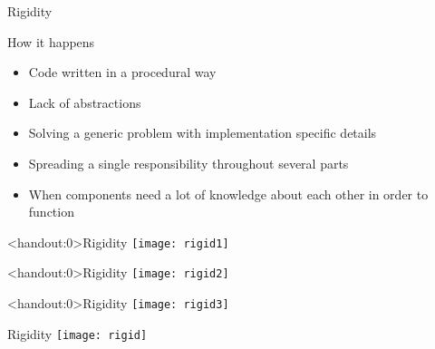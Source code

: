 \documentclass[xcolor=svgnames]{beamer}
\begin{document}
{%
%
\begin{frame}{Rigidity}

    How it happens
    \begin{itemize}
        \item<1-> Code written in a procedural way
        \item<2-> Lack of abstractions
        \item<3-> Solving a generic problem with implementation specific details
        \item<4-> Spreading a single responsibility throughout several parts
        \item<5-> When components need a lot of knowledge about each other in
            order to function
    \end{itemize}
\end{frame}
}


{%
%
\begin{frame}<handout:0>{Rigidity}
    \centering
    \texttt{[image: rigid1]}
\end{frame}
}

{%
%
\begin{frame}<handout:0>{Rigidity}
    \centering
    \texttt{[image: rigid2]}
\end{frame}
}

{%
%
\begin{frame}<handout:0>{Rigidity}
    \centering
    \texttt{[image: rigid3]}
\end{frame}
}

{%
%
\begin{frame}{Rigidity}
    \centering
    \texttt{[image: rigid]}
\end{frame}
}
\end{document}
